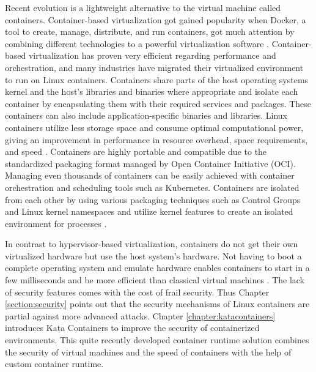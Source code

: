 Recent evolution is a lightweight alternative to the virtual machine called containers. Container-based virtualization got gained popularity when Docker, a tool to create, manage, distribute, and run containers, got much attention by combining different technologies to a powerful virtualization software \cite{Eder2016}. Container-based virtualization has proven very efficient regarding performance and orchestration, and many industries have migrated their virtualized environment to run on Linux containers. Containers share parts of the host operating systems kernel and the host's libraries and binaries where appropriate and isolate each container by encapsulating them with their required services and packages.  These containers can also include application-specific binaries and libraries. Linux containers utilize less storage space and consume optimal computational power, giving an improvement in performance in resource overhead, space requirements, and speed \cite{Toimela2017}\cite{Lingayat2018}. Containers are highly portable and compatible due to the standardized packaging format managed by Open Container Initiative (OCI)\cite{OCI}. Managing even thousands of containers can be easily achieved with container orchestration and scheduling tools such as Kubernetes. Containers are isolated from each other by using various packaging techniques such as Control Groups and Linux kernel namespaces and utilize kernel features to create an isolated environment for processes \cite{Flauzac2020}.

In contrast to hypervisor-based virtualization, containers do not get their own virtualized hardware but use the host system's hardware. Not having to boot a complete operating system and emulate hardware enables containers to start in a few milliseconds and be more efficient than classical virtual machines \cite{Eder2016}. The lack of security features comes with the cost of frail security. Thus Chapter \ref{section:security} points out that the security mechanisms of Linux containers are partial against more advanced attacks. Chapter \ref{chapter:katacontainers} introduces Kata Containers to improve the security of containerized environments. This quite recently developed container runtime solution combines the security of virtual machines and the speed of containers with the help of custom container runtime.

